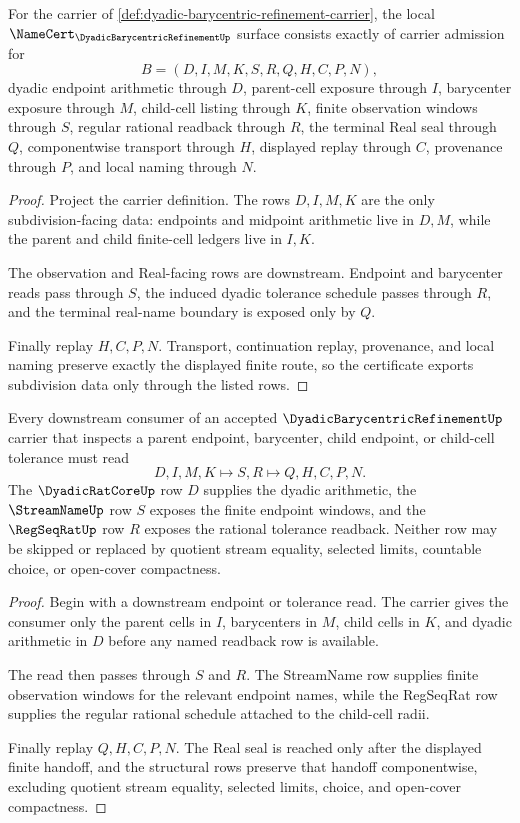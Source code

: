 \begin{theorem}\label{thm:dyadic-barycentric-refinement-namecert-obligations}
For the carrier of \autoref{def:dyadic-barycentric-refinement-carrier}, the local $\NameCert_{\DyadicBarycentricRefinementUp}$ surface consists exactly of carrier admission for
$$
B=(D,I,M,K,S,R,Q,H,C,P,N),
$$
dyadic endpoint arithmetic through $D$, parent-cell exposure through $I$, barycenter exposure through $M$, child-cell listing through $K$, finite observation windows through $S$, regular rational readback through $R$, the terminal Real seal through $Q$, componentwise transport through $H$, displayed replay through $C$, provenance through $P$, and local naming through $N$.
\end{theorem}
\begin{proof}
Project the carrier definition. The rows $D,I,M,K$ are the only subdivision-facing data: endpoints and midpoint arithmetic live in $D,M$, while the parent and child finite-cell ledgers live in $I,K$.

The observation and Real-facing rows are downstream. Endpoint and barycenter reads pass through $S$, the induced dyadic tolerance schedule passes through $R$, and the terminal real-name boundary is exposed only by $Q$.

Finally replay $H,C,P,N$. Transport, continuation replay, provenance, and local naming preserve exactly the displayed finite route, so the certificate exports subdivision data only through the listed rows.
\end{proof}

\begin{theorem}\label{thm:dyadic-barycentric-refinement-regseqrat-handoff}
Every downstream consumer of an accepted $\DyadicBarycentricRefinementUp$ carrier that inspects a parent endpoint, barycenter, child endpoint, or child-cell tolerance must read
$$
D,I,M,K \longmapsto S,R \longmapsto Q,H,C,P,N .
$$
The $\DyadicRatCoreUp$ row $D$ supplies the dyadic arithmetic, the $\StreamNameUp$ row $S$ exposes the finite endpoint windows, and the $\RegSeqRatUp$ row $R$ exposes the rational tolerance readback. Neither row may be skipped or replaced by quotient stream equality, selected limits, countable choice, or open-cover compactness.
\end{theorem}
\begin{proof}
Begin with a downstream endpoint or tolerance read. The carrier gives the consumer only the parent cells in $I$, barycenters in $M$, child cells in $K$, and dyadic arithmetic in $D$ before any named readback row is available.

The read then passes through $S$ and $R$. The StreamName row supplies finite observation windows for the relevant endpoint names, while the RegSeqRat row supplies the regular rational schedule attached to the child-cell radii.

Finally replay $Q,H,C,P,N$. The Real seal is reached only after the displayed finite handoff, and the structural rows preserve that handoff componentwise, excluding quotient stream equality, selected limits, choice, and open-cover compactness.
\end{proof}

